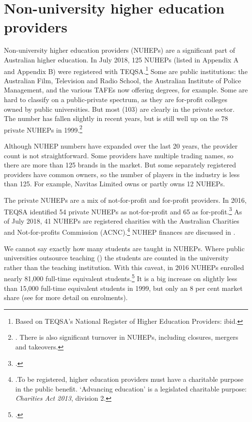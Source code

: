 \documentclass{grattan}
\begin{document}
%
\section{Non-university higher education providers}\label{sec:non-university-higher-education-providers}

Non-university higher education providers (NUHEPs) are a significant part of Australian higher education. In July 2018, 125 NUHEPs (listed in Appendix A and Appendix B) were registered with TEQSA.\footnote{Based on TEQSA's National Register of Higher Education Providers: ibid.} Some are public institutions: the Australian Film, Television and Radio School, the Australian Institute of Police Management, and the various TAFEs now offering degrees, for example. Some are hard to classify on a public-private spectrum, as they are for-profit colleges owned by public universities. But most (103) are clearly in the private sector. The number has fallen slightly in recent years, but is still well up on the 78 private NUHEPs in 1999.\footnote{\textcite[][]{Watson2000surveyofprivatep}. There is also significant turnover in NUHEPs, including closures, mergers and takeovers.}

Although NUHEP numbers have expanded over the last 20 years, the provider count is not straightforward. Some providers have multiple trading names, so there are more than 125 brands in the market. But some separately registered providers have common owners, so the number of players in the industry is less than 125. For example, Navitas Limited owns or partly owns 12 NUHEPs.

The private NUHEPs are a mix of not-for-profit and for-profit providers. In 2016, TEQSA identified 54 private NUHEPs as not-for-profit and 65 as for-profit.\footcite[][6]{TEQSA2018teqsasriskassess} As of July 2018, 41 NUHEPs are registered charities with the Australian Charities and Not-for-profits Commission (ACNC).\footnote{\textcite[][]{ACNC2018acnccharityregist}.To be registered, higher education providers must have a charitable purpose in the public benefit. `Advancing education' is a legislated charitable purpose: \emph{Charities Act 2013}, division 2.} NUHEP finances are discussed in .

We cannot say exactly how many students are taught in NUHEPs. Where public universities outsource teaching () the students are counted in the university rather than the teaching institution. With this caveat, in 2016 NUHEPs enrolled nearly 81,000 full-time equivalent students.\footcite[][12]{TEQSA2018teqsasriskassess} It is a big increase on slightly less than 15,000 full-time equivalent students in 1999, but only an 8 per cent market share (see  for more detail on enrolments).
\end{document}
